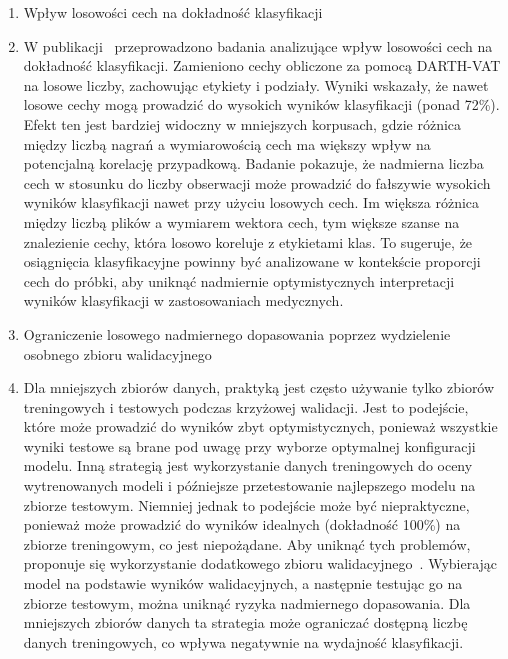 \begin{enumerate}[label={\alph*)}]
  	\item Wpływ losowości cech na dokładność klasyfikacji
	\item[] W publikacji~\cite{SustainedVowelsProblems} przeprowadzono badania analizujące wpływ losowości cech na dokładność klasyfikacji.
Zamieniono cechy obliczone za pomocą DARTH-VAT na losowe liczby, zachowując etykiety i podziały.
Wyniki wskazały, że nawet losowe cechy mogą prowadzić do wysokich wyników klasyfikacji (ponad 72\%).
Efekt ten jest bardziej widoczny w mniejszych korpusach, gdzie różnica między liczbą nagrań a wymiarowością cech ma większy wpływ na potencjalną korelację przypadkową.
Badanie pokazuje, że nadmierna liczba cech w stosunku do liczby obserwacji może prowadzić do fałszywie wysokich wyników klasyfikacji nawet przy użyciu losowych cech.
Im większa różnica między liczbą plików a wymiarem wektora cech, tym większe szanse na znalezienie cechy, która losowo koreluje z etykietami klas.
To sugeruje, że osiągnięcia klasyfikacyjne powinny być analizowane w kontekście proporcji cech do próbki, aby uniknąć nadmiernie optymistycznych interpretacji wyników klasyfikacji w zastosowaniach medycznych.

  	\item Ograniczenie losowego nadmiernego dopasowania poprzez wydzielenie osobnego zbioru walidacyjnego
	\item[] Dla mniejszych zbiorów danych, praktyką jest często używanie tylko zbiorów treningowych i testowych podczas krzyżowej walidacji.
Jest to podejście, które może prowadzić do wyników zbyt optymistycznych, ponieważ wszystkie wyniki testowe są brane pod uwagę przy wyborze optymalnej
konfiguracji modelu.
Inną strategią jest wykorzystanie danych treningowych do oceny wytrenowanych modeli i późniejsze przetestowanie najlepszego modelu na zbiorze testowym.
Niemniej jednak to podejście może być niepraktyczne, ponieważ może prowadzić do wyników idealnych (dokładność 100\%) na zbiorze treningowym, co jest niepożądane.
Aby uniknąć tych problemów, proponuje się wykorzystanie dodatkowego zbioru walidacyjnego~\cite{SustainedVowelsProblems}.
Wybierając model na podstawie wyników walidacyjnych, a następnie testując go na zbiorze testowym, można uniknąć ryzyka nadmiernego dopasowania.
Dla mniejszych zbiorów danych ta strategia może ograniczać dostępną liczbę danych treningowych, co wpływa negatywnie na wydajność klasyfikacji.


\end{enumerate}

